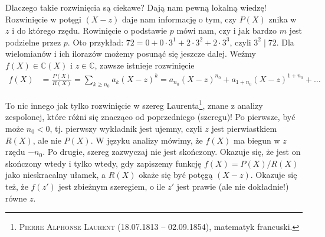 \documentclass[a4paper,fleqn,9pt]{extarticle}
\begin{document}
Dlaczego takie rozwinięcia są ciekawe? Dają nam pewną lokalną wiedzę! Rozwinięcie w potęgi $(X-z)$ daje nam informację o tym, czy $P(X)$ znika w $z$ i do którego rzędu. Rowinięcie o podstawie $p$ mówi nam, czy i jak bardzo $m$ jest podzielne przez $p$. Oto przykład: $72 = 0 + 0 \cdot 3^1 + 2\cdot 3^2+ 2\cdot 3^3$, czyli $3^2\mid 72$. Dla wielomianów i ich ilorazów możemy posunąć się jeszcze dalej. Weźmy $f(X) \in \mathbb C(X)$ i $z\in\mathbb C$, zawsze istnieje rozwinięcie
\begin{align*}
f(X) & = \frac{P(X)}{R(X)} = \sum_{k\ge n_0} a_k(X-z)^k = a_{n_0} (X-z)^{n_0} + a_{1+n_0} (X-z)^{1+n_0} + \dots
\end{align*}

To nic innego jak tylko rozwinięcie w szereg Laurenta\footnote{\textsc{Pierre Alphonse Laurent} (18.07.1813 -- 02.09.1854), matematyk francuski.}, znane z analizy zespolonej, które różni się znacząco od poprzedniego (szeregu)! Po pierwsze, być może $n_0<0$, tj. pierwszy wykładnik jest ujemny, czyli $z$ jest pierwiastkiem $R(X)$, ale nie $P(X)$. W języku analizy mówimy, że $f(X)$ ma biegun w $z$ rzędu $-n_0$. Po drugie, szereg zazwyczaj nie jest skończony. Okazuje się, że jest on skończony wtedy i tylko wtedy, gdy zapiszemy funkcję $f(X) = P(X)/R(X)$ jako nieskracalny ułamek, a $R(X)$ okaże się być potęgą $(X-z)$. Okazuje się też, że $f(z')$ jest zbieżnym szeregiem, o ile $z'$ jest prawie (ale nie dokładnie!) równe $z$.
\end{document}

